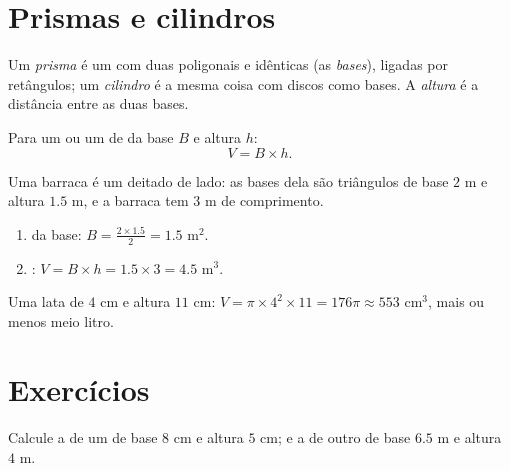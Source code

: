 \section{Prismas e cilindros}

\begin{definition}\label{def:g7:areas:prism}
Um \emph{prisma} é um  com duas  poligonais
 e idênticas (as \emph{bases}), ligadas por retângulos; um
\emph{cilindro} é a mesma coisa com discos como bases.
A \emph{altura} é a distância entre as duas bases.
\end{definition}

\begin{theorem}[Volumes]\label{thm:g7:areas:volume}
Para um  ou um  de  da base $B$ e altura $h$:
\[
V = B \times h .
\]
\end{theorem}
\admitted

\begin{example}\label{ex:g7:areas:volume}
Uma barraca é um  deitado de lado: as bases dela são triângulos
de base $2$ m e altura $1.5$ m, e a barraca tem $3$ m de comprimento.
\begin{enumerate}
  \item {} da base: $B = \frac{2 \times 1.5}{2} = 1.5$ m$^2$.
  \item {}: $V = B \times h = 1.5 \times 3 = 4.5$ m$^3$.
\end{enumerate}
Uma lata de  $4$ cm e altura $11$ cm:
$V = \pi \times 4^2 \times 11 = 176\pi \approx 553$ cm$^3$, mais ou
menos meio litro.
\end{example}

\section{Exercícios}

\begin{exercise}[$\star$]\label{exo:g7:areas:1}
Calcule a  de um  de base $8$ cm e altura $5$ cm; e a
de outro de base $6.5$ m e altura $4$ m.
\end{exercise}

